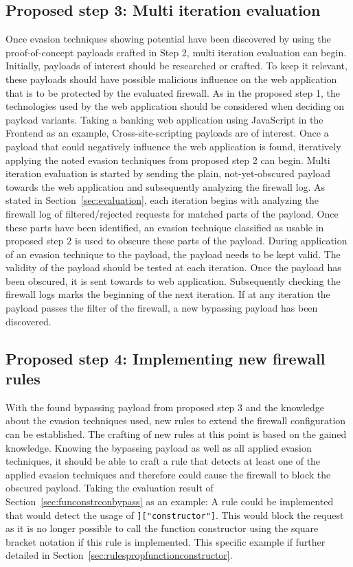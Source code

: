 \subsection{Proposed step 3: Multi iteration evaluation}
Once evasion techniques showing potential have been discovered by using the proof-of-concept payloads crafted in Step 2, multi iteration evaluation can begin. Initially, payloads of interest should be researched or crafted. To keep it relevant, these payloads should have possible malicious influence on the web application that is to be protected by the evaluated firewall. As in the proposed step 1, the technologies used by the web application should be considered when deciding on payload variants. Taking a banking web application using JavaScript in the Frontend as an example, Cross-site-scripting payloads are of interest. Once a payload that could negatively influence the web application is found, iteratively applying the noted evasion techniques from proposed step 2 can begin. Multi iteration evaluation is started by sending the plain, not-yet-obscured payload towards the web application and subsequently analyzing the firewall log. As stated in Section~\ref{sec:evaluation}, each iteration begins with analyzing the firewall log of filtered/rejected requests for matched parts of the payload. Once these parts have been identified, an evasion technique classified as usable in proposed step 2 is used to obscure these parts of the payload. During application of an evasion technique to the payload, the payload needs to be kept valid. The validity of the payload should be tested at each iteration. Once the payload has been obscured, it is sent towards to web application. Subsequently checking the firewall logs marks the beginning of the next iteration. If at any iteration the payload passes the filter of the firewall, a new bypassing payload has been discovered.

\subsection{Proposed step 4: Implementing new firewall rules}
\label{sec:genericproposalstep4}
With the found bypassing payload from proposed step 3 and the knowledge about the evasion techniques used, new rules to extend the firewall configuration can be established. The crafting of new rules at this point is based on the gained knowledge. Knowing the bypassing payload as well as all applied evasion techniques, it should be able to craft a rule that detects at least one of the applied evasion techniques and therefore could cause the firewall to block the obscured payload. 
Taking the evaluation result of Section~\ref{sec:funconstrconbypass} as an example: A rule could be implemented that would detect the usage of \verb|]["constructor"]|. This would block the request as it is no longer possible to call the function constructor using the square bracket notation if this rule is implemented. This specific example if further detailed in Section~\ref{sec:rulespropfunctionconstructor}.

